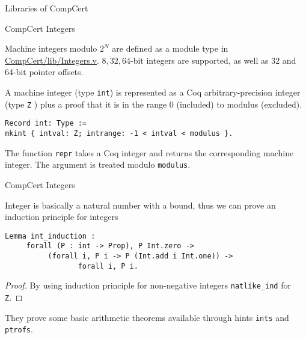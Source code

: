 \documentclass{beamer}
\begin{document}
\begin{frame}

  \begin{center}
    \huge Libraries of CompCert
    \end{center}
  \end{frame}

\begin{frame}[t,fragile]{CompCert Integers}

  Machine integers modulo $2^N$ are defined as a module type in \url{CompCert/lib/Integers.v}. $8, 32, 64$-bit integers are supported, as well as 32 and 64-bit pointer offsets.\\
  
\bigskip

A machine integer (type \texttt{int}) is represented as a Coq arbitrary-precision
integer (type \texttt{Z} ) plus a proof that it is in the range 0 (included) to
modulus (excluded).


\begin{lstlisting}[language=Coq]
Record int: Type :=
mkint { intval: Z; intrange: -1 < intval < modulus }.
\end{lstlisting}

The function \texttt{repr} takes a Coq integer and returns the corresponding machine integer. The argument is treated modulo \texttt{modulus}.

\end{frame}

\begin{frame}[t,fragile]{CompCert Integers}

 Integer is basically a natural number with a bound, thus we can prove an induction principle for integers

\bigskip

\begin{lstlisting}[language=Coq]
  Lemma int_induction :
     forall (P : int -> Prop), P Int.zero ->
          (forall i, P i -> P (Int.add i Int.one)) ->
                 forall i, P i.
\end{lstlisting}

 \begin{proof}

   By using induction principle for non-negative integers \texttt{natlike\_ind} for \texttt{Z}.
                                       
 \end{proof}

 They prove some basic arithmetic theorems available through hints \texttt{ints} and \texttt{ptrofs}.

\end{frame}
\end{document}
